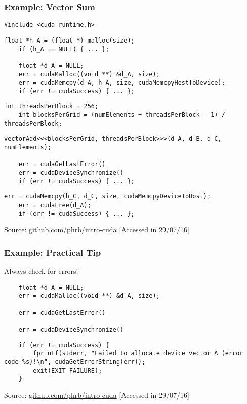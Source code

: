 \documentclass[10pt, compress]{beamer}
\begin{document}
\begin{frame}[fragile]
    \frametitle{Example: Vector Sum}
    \begin{lstlisting}[basicstyle=\ttfamily\scriptsize]
    #include <cuda_runtime.h>
    \end{lstlisting}
    \pause
    \begin{lstlisting}[basicstyle=\ttfamily\scriptsize]
    float *h_A = (float *) malloc(size);
    if (h_A == NULL) { ... };

    float *d_A = NULL;
    err = cudaMalloc((void **) &d_A, size);
    err = cudaMemcpy(d_A, h_A, size, cudaMemcpyHostToDevice);
    if (err != cudaSuccess) { ... };
    \end{lstlisting}
    \pause
    \begin{lstlisting}[basicstyle=\ttfamily\scriptsize]
    int threadsPerBlock = 256;
    int blocksPerGrid = (numElements + threadsPerBlock - 1) / threadsPerBlock;
    \end{lstlisting}
    \pause
    \begin{lstlisting}[basicstyle=\ttfamily\scriptsize]
    vectorAdd<<<blocksPerGrid, threadsPerBlock>>>(d_A, d_B, d_C, numElements);

    err = cudaGetLastError()
    err = cudaDeviceSynchronize()
    if (err != cudaSuccess) { ... };
    \end{lstlisting}
    \pause
    \begin{lstlisting}[basicstyle=\ttfamily\scriptsize]
    err = cudaMemcpy(h_C, d_C, size, cudaMemcpyDeviceToHost);
    err = cudaFree(d_A);
    if (err != cudaSuccess) { ... };
    \end{lstlisting}

    \vfill

    \begin{center}
        \tiny{Source: \url{github.com/phrb/intro-cuda} [Accessed in 29/07/16]}
    \end{center}
\end{frame}

\begin{frame}[fragile]
    \frametitle{Example: Practical Tip}
    \alert{Always} check for errors!

    \begin{lstlisting}
    float *d_A = NULL;
    err = cudaMalloc((void **) &d_A, size);

    err = cudaGetLastError()

    err = cudaDeviceSynchronize()
    \end{lstlisting}
    \pause
    \begin{lstlisting}
    if (err != cudaSuccess) {
        fprintf(stderr, "Failed to allocate device vector A (error code %s)!\n", cudaGetErrorString(err));
        exit(EXIT_FAILURE);
    }
    \end{lstlisting}

    \begin{center}
        \tiny{Source: \url{github.com/phrb/intro-cuda} [Accessed in 29/07/16]}
    \end{center}
\end{frame}
\end{document}
